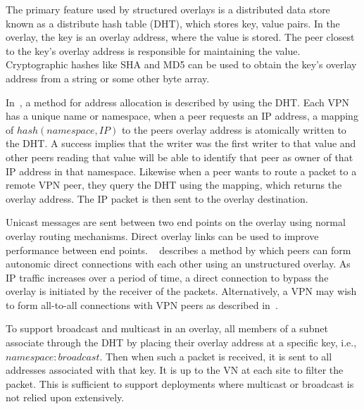 The primary feature used by structured overlays is a distributed data store
known as a distribute hash table (DHT), which stores key, value pairs.  In
the overlay, the key is an overlay address, where the value is stored.  The
peer closest to the key's overlay address is responsible for maintaining the
value.  Cryptographic hashes like SHA and MD5 can be used to obtain the key's
overlay address from a string or some other byte array.

In~\cite{pcgrid07, i3}, a method for address allocation is described by using
the DHT.  Each VPN has a unique name or namespace, when a peer requests an
IP address, a mapping of $hash(namespace, IP)$ to the peers overlay address
is atomically written to the DHT.  A success implies that the writer was the
first writer to that value and other peers reading that value will be able to
identify that peer as owner of that IP address in that namespace.  Likewise
when a peer wants to route a packet to a remote VPN peer, they query the DHT
using the mapping, which returns the overlay address.  The IP packet is then
sent to the overlay destination.

Unicast messages are sent between two end points on the overlay using normal
overlay routing mechanisms.  Direct overlay links can be used to improve
performance between end points.  ~\cite{ipop} describes a method by which peers
can form autonomic direct connections with each other using an unstructured
overlay.  As IP traffic increases over a period of time, a direct connection to
bypass the overlay is initiated by the receiver of the packets.  Alternatively,
a VPN may wish to form all-to-all connections with VPN peers as described
in~\cite{cops08}.

To support broadcast and multicast in an overlay, all members of a subnet
associate through the DHT by placing their overlay address at a specific key,
i.e., $namespace:broadcast$.  Then when such a packet is received, it is sent
to all addresses associated with that key.  It is up to the VN at each site to
filter the packet.  This is sufficient to support deployments where multicast
or broadcast is not relied upon extensively.  

